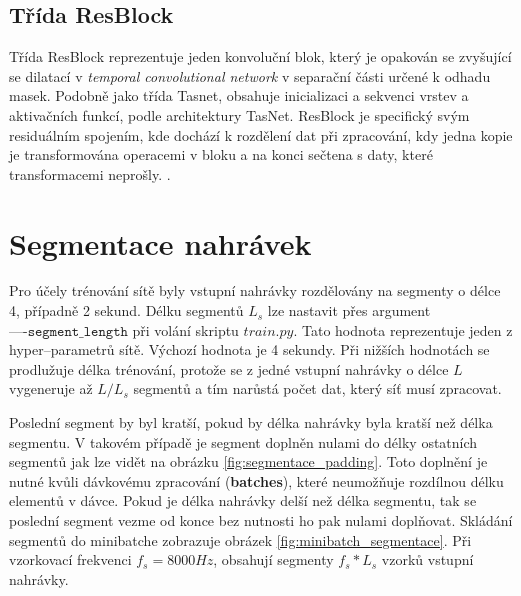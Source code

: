 
\subsection*{Třída ResBlock}
Třída ResBlock reprezentuje jeden konvoluční blok, který je opakován se zvyšující se dilatací v \textit{temporal convolutional network} v separační části určené k odhadu masek. Podobně jako třída Tasnet, obsahuje inicializaci a sekvenci vrstev a aktivačních funkcí, podle architektury TasNet. ResBlock je specifický svým residuálním spojením, kde dochází k rozdělení dat při zpracování, kdy jedna kopie je transformována operacemi v bloku a na konci sečtena s daty, které transformacemi neprošly.
.


\section{Segmentace nahrávek}
\label{sec:segmentace}
Pro účely trénování sítě byly vstupní nahrávky rozdělovány na segmenty o délce 4, případně 2 sekund. Délku segmentů $L_s$ lze nastavit přes argument $\texttt{----segment\_length}$ při volání skriptu $train.py$. Tato hodnota reprezentuje jeden z hyper--parametrů sítě. Výchozí hodnota je 4 sekundy. Při nižších hodnotách se prodlužuje délka trénování, protože se z jedné vstupní nahrávky o délce $L$ vygeneruje až $L/L_s$  segmentů a tím narůstá počet dat, který síť musí zpracovat. 

Poslední segment by byl kratší, pokud by délka nahrávky byla kratší než délka segmentu. V takovém případě je segment doplněn nulami do délky ostatních segmentů jak lze vidět na obrázku \ref{fig:segmentace_padding}. Toto doplnění je nutné kvůli dávkovému zpracování (\textbf{batches}), které neumožňuje rozdílnou délku elementů v dávce. Pokud je délka nahrávky delší než délka segmentu, tak se poslední segment vezme od konce bez nutnosti ho pak nulami doplňovat. Skládání segmentů do minibatche zobrazuje obrázek \ref{fig:minibatch_segmentace}. Při vzorkovací frekvenci $f_s = 8000Hz$, obsahují segmenty $f_s * L_s$ vzorků vstupní nahrávky. 

